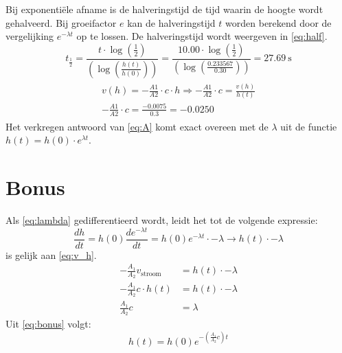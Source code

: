 \documentclass{scrartcl}
\begin{document}
Bij exponentiële afname is de halveringstijd de tijd waarin de hoogte wordt gehalveerd. Bij groeifactor $e$ kan de halveringstijd $t$ worden berekend door de vergelijking $e^{-\lambda t}$ op te lossen. De halveringstijd wordt weergeven in \cref{eq:half}.
\begin{equation}\label{eq:half}
t_{\frac{1}{2}} = \frac{t \cdot \log(\frac{1}{2})}{\left(\log \left(\frac{h(t)}{h(0)}\right)\right)} = \frac{10.00 \cdot \log(\frac{1}{2})}{\left(\log \left(\frac{0.233567}{0.30}\right)\right)} = \SI{27.69}{\second}
\end{equation}
\begin{align}\label{eq:A}
\begin{split}
v(h) = -\frac{A1}{A2} \cdot c \cdot h \Rightarrow -\frac{A1}{A2} \cdot c =\frac{v(h)}{h(t)}\\
-\frac{A1}{A2} \cdot c = \frac{-0.0075}{0.3} = -0.0250
\end{split}
\end{align}
Het verkregen antwoord van \cref{eq:A} komt exact overeen met de $\lambda$ uit de functie $h(t) = h(0)\cdot e^{\lambda t}$.

\newpage
\section{Bonus}
Als \cref{eq:lambda} gedifferentieerd wordt, leidt het tot de volgende expressie:
    \begin{equation}\label{eq:h_t_afgeleide_exp}
        \frac{dh}{dt} = h(0)\frac{de^{-\lambda t}}{dt} = h(0)e^{-\lambda t}\cdot-\lambda \rightarrow h(t)\cdot-\lambda
    \end{equation}
     is gelijk aan \cref{eq:v_h}.
    \begin{equation}\label{eq:bonus}
        \begin{split}
            -\frac{A_1}{A_2}v_{\text{stroom}} &= h(t)\cdot-\lambda\\
            -\frac{A_1}{A_2}c\cdot h(t) &= h(t)\cdot-\lambda\\
            \frac{A_1}{A_2}c &= \lambda
        \end{split}
    \end{equation}
    Uit \cref{eq:bonus} volgt:
    \begin{equation*}
        h(t) = h(0)e^{-\left(\frac{A_1}{A_2}c\right)t}
    \end{equation*}
    
\end{document}
